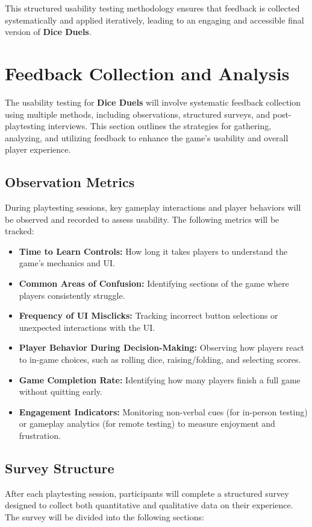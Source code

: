 \documentclass{article}
\begin{document}
This structured usability testing methodology ensures that feedback is collected systematically and applied iteratively, leading to an engaging and accessible final version of \textbf{Dice Duels}.

\newpage

\section{Feedback Collection and Analysis}

The usability testing for \textbf{Dice Duels} will involve systematic feedback collection using multiple methods, including observations, structured surveys, and post-playtesting interviews. This section outlines the strategies for gathering, analyzing, and utilizing feedback to enhance the game’s usability and overall player experience.

\subsection{Observation Metrics}
During playtesting sessions, key gameplay interactions and player behaviors will be observed and recorded to assess usability. The following metrics will be tracked:
\begin{itemize}
    \item \textbf{Time to Learn Controls:} How long it takes players to understand the game’s mechanics and UI.
    \item \textbf{Common Areas of Confusion:} Identifying sections of the game where players consistently struggle.
    \item \textbf{Frequency of UI Misclicks:} Tracking incorrect button selections or unexpected interactions with the UI.
    \item \textbf{Player Behavior During Decision-Making:} Observing how players react to in-game choices, such as rolling dice, raising/folding, and selecting scores.
    \item \textbf{Game Completion Rate:} Identifying how many players finish a full game without quitting early.
    \item \textbf{Engagement Indicators:} Monitoring non-verbal cues (for in-person testing) or gameplay analytics (for remote testing) to measure enjoyment and frustration.
\end{itemize}

\subsection{Survey Structure}
After each playtesting session, participants will complete a structured survey designed to collect both quantitative and qualitative data on their experience. The survey will be divided into the following sections:
\end{document}
